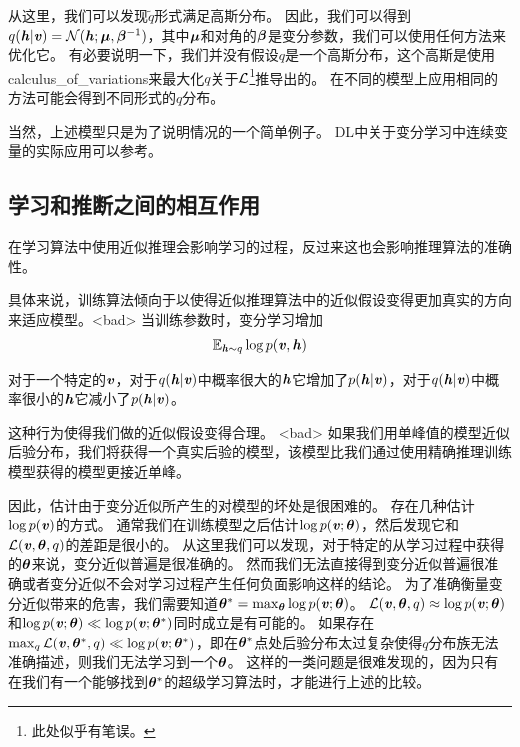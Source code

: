 从这里，我们可以发现$\tilde{q}$形式满足高斯分布。
因此，我们可以得到$q(\Vh\vert\Vv) = \CalN(\Vh;\Vmu,\Vbeta^{-1})$，其中$\Vmu$和对角的$\Vbeta$是变分参数，我们可以使用任何方法来优化它。
有必要说明一下，我们并没有假设$q$是一个高斯分布，这个高斯是使用\gls{calculus_of_variations}来最大化$q$关于$\CalL$\footnote{此处似乎有笔误。}推导出的。
在不同的模型上应用相同的方法可能会得到不同形式的$q$分布。

当然，上述模型只是为了说明情况的一个简单例子。
\gls{DL}中关于变分学习中连续变量的实际应用可以参考\citet{Goodfeli-et-al-TPAMI-Deep-PrePrint-2013-small}。



\subsection{学习和推断之间的相互作用}
\label{sec:interactions_between_learning_and_inference}


在学习算法中使用近似推理会影响学习的过程，反过来这也会影响推理算法的准确性。


具体来说，训练算法倾向于以使得近似推理算法中的近似假设变得更加真实的方向来适应模型。<bad>
当训练参数时，变分学习增加
\begin{align}
\label{eqn:1968}
	\SetE_{\Vh \sim q}\log p(\Vv,\Vh)
\end{align}

对于一个特定的$\Vv$，对于$q(\Vh \vert \Vv)$中概率很大的$\Vh$它增加了$p(\Vh\vert\Vv)$，对于$q(\Vh \vert \Vv)$中概率很小的$\Vh$它减小了$p(\Vh\vert\Vv)$。

这种行为使得我们做的近似假设变得合理。 %
<bad> 如果我们用单峰值的模型近似后验分布，我们将获得一个真实后验的模型，该模型比我们通过使用精确推理训练模型获得的模型更接近单峰。


因此，估计由于变分近似所产生的对模型的坏处是很困难的。
存在几种估计$\log p(\Vv)$的方式。
通常我们在训练模型之后估计$\log p(\Vv;\Vtheta)$，然后发现它和$\CalL(\Vv,\Vtheta,q)$的差距是很小的。
从这里我们可以发现，对于特定的从学习过程中获得的$\Vtheta$来说，变分近似普遍是很准确的。
然而我们无法直接得到变分近似普遍很准确或者变分近似不会对学习过程产生任何负面影响这样的结论。
为了准确衡量变分近似带来的危害，我们需要知道$\Vtheta^* = \max_{\Vtheta} \log p(\Vv;\Vtheta)$。
$\CalL(\Vv,\Vtheta,q)\approx \log p(\Vv;\Vtheta)$和$\log p(\Vv;\Vtheta)\ll \log p(\Vv;\Vtheta^*)$同时成立是有可能的。
如果存在$\max_q \CalL(\Vv,\Vtheta^*,q)\ll \log p(\Vv;\Vtheta^*)$，即在$\Vtheta^*$点处后验分布太过复杂使得$q$分布族无法准确描述，则我们无法学习到一个$\Vtheta$。
这样的一类问题是很难发现的，因为只有在我们有一个能够找到$\Vtheta^*$的超级学习算法时，才能进行上述的比较。



